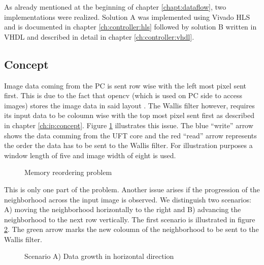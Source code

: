 As already mentioned at the beginning of chapter \ref{chapt:dataflow}, two
implementations were realized. Solution A was implemented using Vivado HLS and
is documented in chapter \ref{ch:controller:hls} followed by solution B written
in VHDL and described in detail in chapter \ref{ch:controller:vhdl}. 

\subsection{Concept} \label{ch:control:concept}
Image data coming from the PC is sent row wise with the left most pixel sent
first. This is due to the fact that \gls{opencv} (which is used on PC
side to access
images) stores the image data in said layout \cite{opencv_structures}. The
Wallis filter however, requires its input data to be coloumn wise with the top
most pixel sent first as described in chapter \ref{ch:ip:concept}. Figure 
\ref{fig:memproblem} illustrates this issue. The blue ``write'' arrow shows the data
comming from the UFT core and the red ``read'' arrow represents the order the
data has to be sent to the Wallis filter. For illustration purposes a window
length of five and image width of eight is used.

\begin{figure}[H]
    \centering
    \begin{adjustbox}{scale=0.7}
        
    \end{adjustbox}
    \caption{Memory reordering problem}
    \label{fig:memproblem}
\end{figure}

This is only one part of the problem. Another issue arises if the
progression of the neighborhood across the input image is observed. We
distinguish two scenarios: A) moving the neighborhood horizontally to the right
and B) advancing the neighborhood to the next row vertically. The first
scenario is illustrated in figure \ref{fig:memproblemgrowthx}. The green arrow
marks the new coloumn of the neighborhood to be sent to the Wallis filter.

\begin{figure}[H]
    \centering
    \begin{adjustbox}{scale=0.7}
        
    \end{adjustbox}
    \caption{Scenario A) Data growth in horizontal direction}
    \label{fig:memproblemgrowthx}
\end{figure}

